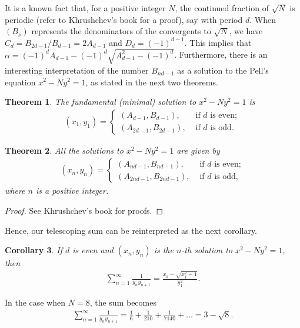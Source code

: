 \documentclass[12pt]{article}
\theoremstyle{plain}
\newtheorem{theorem}{Theorem}
\newtheorem{corollary}[theorem]{Corollary}
\theoremstyle{definition}
\theoremstyle{remark}
\begin{document}
It is a known fact that, for a positive integer $ N $, the continued fraction of $ \sqrt{N} $ is periodic (refer to Khrushchev's book \cite{Khrushchev_08} for a proof), say with period $ d $. When $ (B_\nu) $ represents the denominators of the convergents to $ \sqrt{N} $, we have $ C_d = B_{2d - 1}/B_{d - 1} = 2A_{d - 1} $ and $ D_d = (-1)^{d - 1} $. This implies that $ \alpha = (-1)^d A_{d - 1} - (-1)^d \sqrt{A_{d - 1}^2 - (-1)^d} $. Furthermore, there is an interesting interpretation of the number $ B_{nd - 1} $ as a solution to the Pell's equation $ x^2 - Ny^2 = 1 $, as stated in the next two theorems.
\begin{theorem} The fundamental (minimal) solution to $ x^2 - Ny^2 = 1 $ is 
\begin{align*}
	(x_1, y_1) = \begin{cases} (A_{d - 1}, B_{d - 1}), &\text{ if } d \text{ is even}; \\ (A_{2d - 1}, B_{2d - 1}), &\text{ if } d \text{ is odd}. \end{cases}
\end{align*}
\end{theorem}

\begin{theorem} All the solutions to $ x^2 - Ny^2 = 1 $ are given by
\begin{align*}
	(x_n, y_n) = \begin{cases} (A_{nd - 1}, B_{nd - 1}), &\text{ if } d \text{ is even}; \\ (A_{2nd - 1}, B_{2nd - 1}), &\text{ if } d \text{ is odd}, \end{cases}
\end{align*}
where $ n $ is a positive integer.
\end{theorem}

\begin{proof} See Khrushchev's book \cite{Khrushchev_08} for proofs.
\end{proof}

Hence, our telescoping sum can be reinterpreted as the next corollary.
\begin{corollary} If $ d $ is even and $ (x_n, y_n) $ is the $ n $-th solution to $ x^2 - Ny^2 = 1 $, then
\begin{align*}
	\sum_{n = 1}^\infty \frac{1}{y_n y_{n + 1}} = \frac{x_1 - \sqrt{x_1^2 - 1}}{y_1^2}.
\end{align*}	
\end{corollary}

In the case when $ N = 8 $, the sum becomes 
\begin{align*}
\sum_{n = 1}^\infty \frac{1}{y_n y_{n + 1}} = \frac{1}{6} + \frac{1}{210} + \frac{1}{7140} + \ldots = 3 - \sqrt{8}.
\end{align*}
\end{document}

